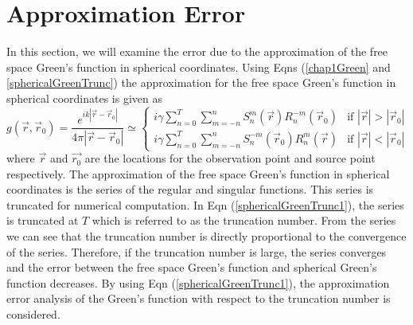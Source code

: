 \section{Approximation Error }
In this section, we will examine the error due to the  approximation of the free space Green's function in spherical coordinates. Using  Eqns (\ref{chap1Green} and \ref{sphericalGreenTrunc}) the approximation  for the free space Green's function in spherical coordinates  is given as
\begin{equation}
\label{sphericalGreenTrunc1}
g(\vec{r},\vec{r}_0)= \frac{e^{ik|\vec{r}-\vec{r}_0|}}{4\pi |\vec{r}-\vec{r}_0|}\simeq \begin{cases}i\gamma \sum_{n=0}^{T}\sum_{m=-n}^{n}S_{n}^{m}( \vec{r})R_{n}^{-m}(\vec{r}_0)&\mbox{if } |\vec{r}|>|\vec{r}_0|\\
i\gamma \sum_{n=0}^{T}\sum_{m=-n}^{n}S_{n}^{-m}( \vec{r}_0)R_{n}^{m}( \vec{r})&\mbox{if } |\vec{r}|<|\vec{r}_0|
\end{cases}
\end{equation}
where $\vec{r}$ and $\vec{r_0}$ are the locations for the observation point and source point respectively.  The approximation of the free space Green's function in spherical coordinates is the series  of the  regular and singular functions. This series is truncated for numerical computation. In  Eqn (\ref{sphericalGreenTrunc1}), the series is truncated at  $T$ which is referred to as the  truncation number. From the series we can see that the  truncation number is directly proportional to the convergence of the series. Therefore, if the truncation number is large, the series converges and the error between the free space Green's function and spherical Green's function decreases. By using  Eqn (\ref{sphericalGreenTrunc1}),   the approximation  error analysis of   the Green's function with respect  to the truncation number is considered. 

